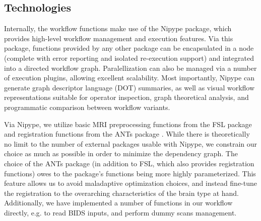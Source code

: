 \subsection{Technologies}

Internally, the workflow functions make use of the Nipype \cite{nipype} package, which provides high-level workflow management and execution features.
Via this package, functions provided by any other package can be encapsulated in a node (complete with error reporting and isolated re-execution support) and integrated into a directed workflow graph.
Paralellization can also be managed via a number of execution plugins, allowing excellent scalability.
Most importantly, Nipype can generate graph descriptor language (DOT) summaries, as well as visual workflow representations suitable for operator inspection, graph theoretical analysis, and programmatic comparison between workflow variants.

Via Nipype, we utilize basic MRI preprocessing functions from the FSL package \cite{fsl} and registration functions from the ANTs package \cite{ants}.
While there is theoretically no limit to the number of external packages usable with Nipype, we constrain our choice as much as possible in order to minimize the dependency graph.
The choice of the ANTs package (in addition to FSL, which also provides registration functions) owes to the package's functions being more highly parameterized.
This feature allows us to avoid maladaptive optimization choices, and instead fine-tune the registration to the overarching characteristics of the brain type at hand.
Additionally, we have implemented a number of functions in our workflow directly, e.g. to read BIDS \cite{bids} inputs, and perform dummy scans management.

